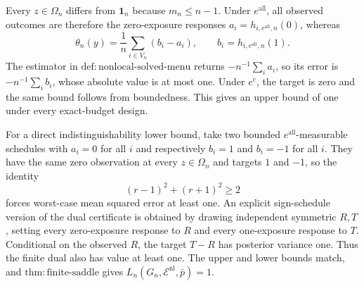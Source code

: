 Every \(z\in\Omega_n\) differs from \(\mathbf 1_n\) because \(m_n\le n-1\).  Under \(e^{\mathrm{all}}\), all observed outcomes are therefore the zero-exposure responses \(a_i=h_{i,e^{\mathrm{all}},n}(0)\), whereas
\[
 \theta_n(y)=\frac1n\sum_{i\in V_n}(b_i-a_i),
 \qquad b_i=h_{i,e^{\mathrm{all}},n}(1).
\]
The estimator in \(\mathrm{def{:}nonlocal\text{-}solved\text{-}menu}\) returns \(-n^{-1}\sum_i a_i\), so its error is \(-n^{-1}\sum_i b_i\), whose absolute value is at most one.  Under \(e^{\mathrm c}\), the target is zero and the same bound follows from boundedness.  This gives an upper bound of one under every exact-budget design.

For a direct indistinguishability lower bound, take two bounded \(e^{\mathrm{all}}\)-measurable schedules with \(a_i=0\) for all \(i\) and respectively \(b_i=1\) and \(b_i=-1\) for all \(i\).  They have the same zero observation at every \(z\in\Omega_n\) and targets \(1\) and \(-1\), so the identity
\[
 (r-1)^2+(r+1)^2\ge2
\]
forces worst-case mean squared error at least one.  An explicit sign-schedule version of the dual certificate is obtained by drawing independent symmetric \(R,T\), setting every zero-exposure response to \(R\) and every one-exposure response to \(T\).  Conditional on the observed \(R\), the target \(T-R\) has posterior variance one.  Thus the finite dual also has value at least one.  The upper and lower bounds match, and \(\mathrm{thm{:}finite\text{-}saddle}\) gives \(L_n(G_n,\mathcal E^{\mathrm{nl}},\bar p)=1\).